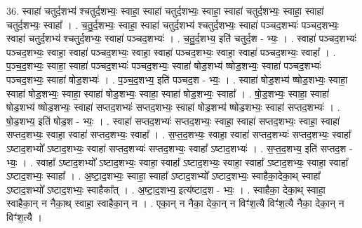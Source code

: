 \documentclass[17pt]{extarticle}
\begin{document}
36. स्वाहा॑ चतुर्द॒शभ्य॑ श्चतुर्द॒शभ्यः॒ स्वाहा॒ स्वाहा॑ चतुर्द॒शभ्यः॒ स्वाहा॒ स्वाहा॑ चतुर्द॒शभ्यः॒ स्वाहा॒ स्वाहा॑ चतुर्द॒शभ्यः॒ स्वाहा᳚ । . च॒तु॒र्द॒शभ्यः॒ स्वाहा॒ स्वाहा॑ चतुर्द॒शभ्य॑ श्चतुर्द॒शभ्यः॒ स्वाहा॑ पञ्चद॒शभ्यः॑ पञ्चद॒शभ्यः॒ स्वाहा॑ चतुर्द॒शभ्य॑ श्चतुर्द॒शभ्यः॒ स्वाहा॑ पञ्चद॒शभ्यः॑ । . च॒तु॒र्द॒शभ्य॒ इति॑ चतुर्द॒श - भ्यः॒ । . स्वाहा॑ पञ्चद॒शभ्यः॑ पञ्चद॒शभ्यः॒ स्वाहा॒ स्वाहा॑ पञ्चद॒शभ्यः॒ स्वाहा॒ स्वाहा॑ पञ्चद॒शभ्यः॒ स्वाहा॒ स्वाहा॑ पञ्चद॒शभ्यः॒ स्वाहा᳚ । . प॒ञ्च॒द॒शभ्यः॒ स्वाहा॒ स्वाहा॑ पञ्चद॒शभ्यः॑ पञ्चद॒शभ्यः॒ स्वाहा॑ षोड॒शभ्य॑ ष्षोड॒शभ्यः॒ स्वाहा॑ पञ्चद॒शभ्यः॑ पञ्चद॒शभ्यः॒ स्वाहा॑ षोड॒शभ्यः॑ । . प॒ञ्च॒द॒शभ्य॒ इति॑ पञ्चद॒श - भ्यः॒ । . स्वाहा॑ षोड॒शभ्य॑ ष्षोड॒शभ्यः॒ स्वाहा॒ स्वाहा॑ षोड॒शभ्यः॒ स्वाहा॒ स्वाहा॑ षोड॒शभ्यः॒ स्वाहा॒ स्वाहा॑ षोड॒शभ्यः॒ स्वाहा᳚ । . षो॒ड॒शभ्यः॒ स्वाहा॒ स्वाहा॑ षोड॒शभ्य॑ ष्षोड॒शभ्यः॒ स्वाहा॑ सप्तद॒शभ्यः॑ सप्तद॒शभ्यः॒ स्वाहा॑ षोड॒शभ्य॑ ष्षोड॒शभ्यः॒ स्वाहा॑ सप्तद॒शभ्यः॑ । . षो॒ड॒शभ्य॒ इति॑ षोड॒श - भ्यः॒ । . स्वाहा॑ सप्तद॒शभ्यः॑ सप्तद॒शभ्यः॒ स्वाहा॒ स्वाहा॑ सप्तद॒शभ्यः॒ स्वाहा॒ स्वाहा॑ सप्तद॒शभ्यः॒ स्वाहा॒ स्वाहा॑ सप्तद॒शभ्यः॒ स्वाहा᳚ । . स॒प्त॒द॒शभ्यः॒ स्वाहा॒ स्वाहा॑ सप्तद॒शभ्यः॑ सप्तद॒शभ्यः॒ स्वाहा᳚ ऽष्टाद॒शभ्यो᳚ ऽष्टाद॒शभ्यः॒ स्वाहा॑ सप्तद॒शभ्यः॑ सप्तद॒शभ्यः॒ स्वाहा᳚ ऽष्टाद॒शभ्यः॑ । . स॒प्त॒द॒शभ्य॒ इति॑ सप्तद॒श - भ्यः॒ । . स्वाहा᳚ ऽष्टाद॒शभ्यो᳚ ऽष्टाद॒शभ्यः॒ स्वाहा॒ स्वाहा᳚ ऽष्टाद॒शभ्यः॒ स्वाहा॒ स्वाहा᳚ ऽष्टाद॒शभ्यः॒ स्वाहा॒ स्वाहा᳚ ऽष्टाद॒शभ्यः॒ स्वाहा᳚ । . अ॒ष्टा॒द॒शभ्यः॒ स्वाहा॒ स्वाहा᳚ ऽष्टाद॒शभ्यो᳚ ऽष्टाद॒शभ्यः॒ स्वाहैका॒देका॒थ् स्वाहा᳚ ऽष्टाद॒शभ्यो᳚ ऽष्टाद॒शभ्यः॒ स्वाहैका᳚त् । . अ॒ष्टा॒द॒शभ्य॒ इत्य॑ष्टाद॒श - भ्यः॒ । . स्वाहैका॒ देका॒थ् स्वाहा॒ स्वाहैका॒न् न नैका॒थ् स्वाहा॒ स्वाहैका॒न् न । . एका॒न् न नैका॒ देका॒न् न विꣳ॑श॒त्यै विꣳ॑श॒त्यै नैका॒ देका॒न् न विꣳ॑श॒त्यै । \newline
\end{document}
